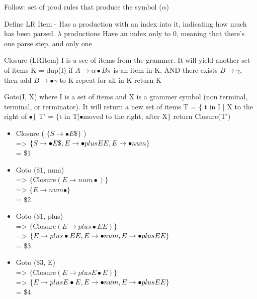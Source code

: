 \documentclass[11pt]{article}
\begin{document}
    Follow:
    set of prod rules that produce the symbol ($\alpha$)
    
    Define LR Item
    - Has a production with an index into it, indicating how much has been parsed. $\lambda$ productions Have an index only to 0, meaning that there's one parse step, and only one

    Closure (LRItem)
    I is a sec of items from the grammer. It will yield another set of items
    K = dup(I)
    if $A \to \alpha \bullet B \pi$ is an item in K, AND there exists $B \to \gamma$, then add $B \to \bullet \gamma$ to K
    repeat for all in K
    return K

    Goto(I, X) where I is a set of items and X is a grammer symbol (non terminal, terminal, or terminator). It will return a new set of items
    T = $\{$ t in I | X to the right of $\bullet \}$
    T' = $\{ \textrm{t in T} |\bullet \textrm{moved to the right, after X} \}$
    return Closure(T')

    \begin{itemize}
        \item Closure ( $\{ S \to \bullet E \$ \}$ ) \\
            => $\{ S \to \bullet E \$, \\
                 E \to \bullet plus E E, \\
                 E \to \bullet num \}$ \\
            = \$1

        \item Goto (\$1, num) \\
            => $\{ \textrm{Closure} ( E \to num \bullet ) \}$ \\
            => $\{ E \to num \bullet \}$ \\
            = \$2

        \item Goto (\$1, plus) \\
            => $\{ \textrm{Closure} ( E \to plus \bullet E E) \}$ \\
            => $\{ E \to plus \bullet E E, \\
                    E \to \bullet num, \\
                    E \to \bullet plus E E \}$ \\
            = \$3

        \item Goto (\$3, E) \\
            => $\{ \textrm{Closure} ( E \to plus E \bullet E ) \}$ \\
            => $\{ E \to plus E \bullet E, \\
                 E \to \bullet num, \\
                 E \to \bullet plus E E \}$ \\
            = \$4
    \end{itemize}
\end{document}
